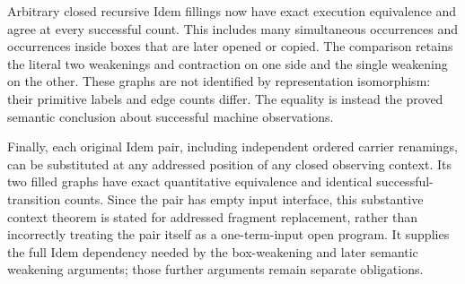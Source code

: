 Arbitrary closed recursive Idem fillings now have exact execution
equivalence and agree at every successful count. This includes many
simultaneous occurrences and occurrences inside boxes that are later opened
or copied. The comparison retains the literal two weakenings and contraction
on one side and the single weakening on the other. These graphs are not
identified by representation isomorphism: their primitive labels and edge
counts differ. The equality is instead the proved semantic conclusion about
successful machine observations.

Finally, each original Idem pair, including independent ordered carrier
renamings, can be substituted at any addressed position of any closed
observing context. Its two filled graphs have exact quantitative equivalence
and identical successful-transition counts. Since the pair has empty input
interface, this substantive context theorem is stated for addressed
fragment replacement, rather than incorrectly treating the pair itself as
a one-term-input open program. It supplies the full Idem dependency needed
by the box-weakening and later semantic weakening arguments; those further
arguments remain separate obligations.

